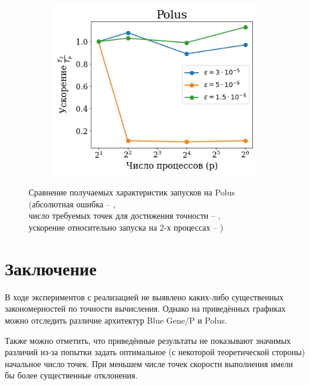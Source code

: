 \documentclass[12pt, fleqn]{article}
\theoremstyle{definition}
\begin{document}
\begin{figure}[ht!]
    \medskip
    \begin{subfigure}[t]{0.45\textwidth}
    \centering
    \vspace{0pt}
        \includegraphics[width=\linewidth]{polus_speed.jpg} 
        \caption{}\label{fig:pl_s}
    \end{subfigure}
    \hfill
    \begin{minipage}[t]{.45\textwidth}
    \caption{Сравнение получаемых характеристик запусков на Polus \\(абсолютная ошибка -- , \\ число требуемых точек для достижения точности -- ,\\ ускорение относительно запуска на 2-х процессах -- )}
    \label{fig:pl}
    \end{minipage}
\end{figure}

\section{Заключение}
В ходе экспериментов с реализацией не выявлено каких-либо существенных закономерностей по точности вычисления. Однако на приведённых графиках можно отследить различие архитектур Blue Gene/P и Polus. 

Также можно отметить, что приведённые результаты не показывают значимых различий из-за попытки задать оптимальное (с некоторой теоретической стороны) начальное число точек. При меньшем числе точек скорости выполнения имели бы более существенные отклонения.
\newpage
\end{document}
